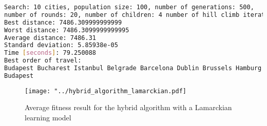 \documentclass{article}
\begin{document}
\begin{lstlisting}[language=bash]
Search: 10 cities, population size: 100, number of generations: 500, 
number of rounds: 20, number of children: 4 number of hill climb iterations: 3: 
Best distance: 7486.309999999999
Worst distance: 7486.3099999999995
Average distance: 7486.31
Standard deviation: 5.85938e-05
Time [seconds]: 79.250088
Best order of travel: 
Budapest Bucharest Istanbul Belgrade Barcelona Dublin Brussels Hamburg Copenhagen 
Budapest
\end{lstlisting}

\begin{figure}[H]
\begin{center}
\texttt{[image: "../hybrid\_algorithm\_lamarckian.pdf]}
\caption{Average fitness result for the hybrid algorithm with a Lamarckian learning model}
\end{center}
\end{figure}
\end{document}
